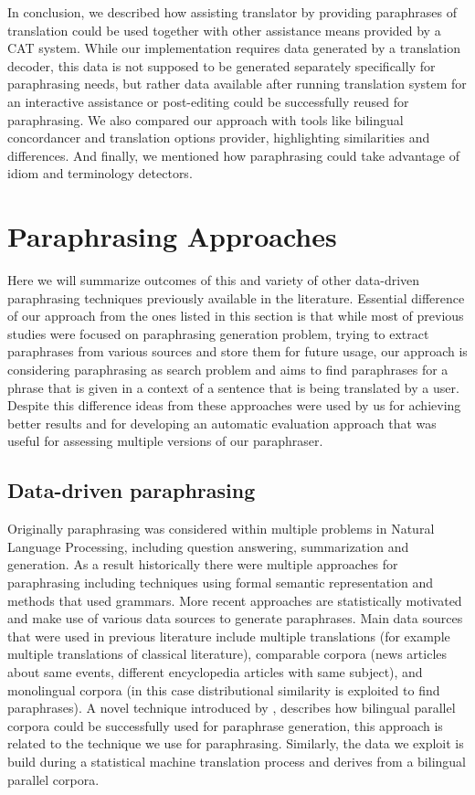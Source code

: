 In conclusion, we described how assisting translator by providing paraphrases of translation could be used together with other assistance means provided by a CAT system. While our implementation requires data generated by a translation decoder, this data is not supposed to be generated separately specifically for paraphrasing needs, but rather data available after running translation system for an interactive assistance or post-editing could be successfully reused for paraphrasing. We also compared our approach with tools like bilingual concordancer and translation options provider, highlighting similarities and differences. And finally, we mentioned how paraphrasing could take advantage of idiom and terminology detectors.

\section{Paraphrasing Approaches}

Here we will summarize outcomes of this and variety of other data-driven paraphrasing techniques previously available in the literature. Essential difference of our approach from the ones listed in this section is that while most of previous studies were focused on paraphrasing generation problem, trying to extract paraphrases from various sources and store them for future usage, our approach is considering paraphrasing as search problem and aims to find paraphrases for a phrase that is given in a context of a sentence that is being translated by a user. Despite this difference ideas from these approaches were used by us for achieving better results and for developing an automatic evaluation approach that was useful for assessing multiple versions of our paraphraser. 

\subsection{Data-driven paraphrasing}

Originally paraphrasing was considered within multiple problems in Natural Language Processing, including question answering, summarization and generation. As a result historically there were multiple approaches for paraphrasing including techniques using formal semantic representation and methods that used grammars. More recent approaches are statistically motivated and make use of various data sources to generate paraphrases. 
Main data sources that were used in previous literature include multiple translations (for example multiple translations of classical literature), comparable corpora (news articles about same events, different encyclopedia articles with same subject), and monolingual corpora (in this case distributional similarity is exploited to find paraphrases). A novel technique introduced by \cite{Callison-Burch2007}, describes how bilingual parallel corpora could be successfully used for paraphrase generation, this approach is related to the technique we use for paraphrasing. Similarly, the data we exploit is build during a statistical machine translation process and derives from a bilingual parallel corpora.

